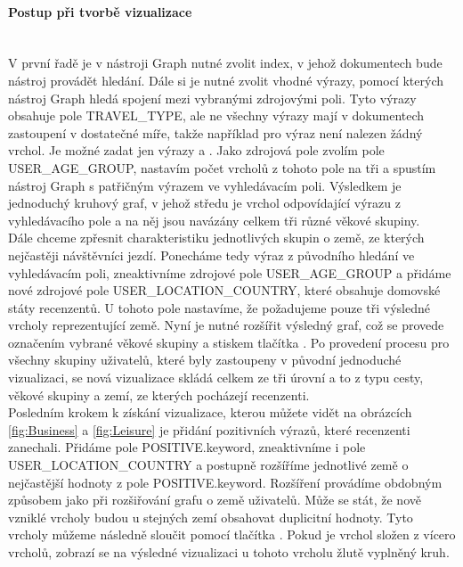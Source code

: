 \documentclass[czech,BP]{thesiskiv}
\begin{document}
\paragraph{Postup při tvorbě vizualizace}
\mbox{}\\
V první řadě je v nástroji Graph nutné zvolit index, v jehož dokumentech bude nástroj provádět hledání. Dále si je nutné zvolit vhodné výrazy, pomocí kterých nástroj Graph hledá spojení mezi vybranými zdrojovými poli. Tyto výrazy obsahuje pole TRAVEL\_TYPE, ale ne všechny výrazy mají v dokumentech zastoupení v dostatečné míře, takže například pro výraz  není nalezen žádný vrchol. Je možné zadat jen výrazy  a . Jako zdrojová pole zvolím pole USER\_AGE\_GROUP, nastavím počet vrcholů z tohoto pole na tři a spustím nástroj Graph s patřičným výrazem ve vyhledávacím poli. Výsledkem je jednoduchý kruhový graf, v jehož středu je vrchol odpovídající výrazu z vyhledávacího pole a na něj jsou navázány celkem tři různé věkové skupiny.
\\
Dále chceme zpřesnit charakteristiku jednotlivých skupin o země, ze kterých nejčastěji návštěvníci jezdí. Ponecháme tedy výraz z původního hledání ve vyhledávacím poli, zneaktivníme zdrojové pole USER\_AGE\_GROUP a přidáme nové zdrojové pole USER\_LOCATION\_COUNTRY, které obsahuje domovské státy recenzentů. U tohoto pole nastavíme, že požadujeme pouze tři výsledné vrcholy reprezentující země. Nyní je nutné rozšířit výsledný graf, což se provede označením vybrané věkové skupiny a stiskem tlačítka . Po provedení procesu  pro všechny skupiny uživatelů, které byly zastoupeny v původní jednoduché vizualizaci, se nová vizualizace skládá celkem ze tři úrovní a to z typu cesty, věkové skupiny a zemí, ze kterých pocházejí recenzenti.
\\
Posledním krokem k získání vizualizace, kterou můžete vidět na obrázcích \ref{fig:Business} a \ref{fig:Leisure} je přidání pozitivních výrazů, které recenzenti zanechali. Přidáme pole POSITIVE.keyword, zneaktivníme i pole USER\_LOCATION\_COUNTRY a postupně rozšíříme jednotlivé země o nejčastější hodnoty z pole POSITIVE.keyword. Rozšíření provádíme obdobným způsobem jako při rozšiřování grafu o země uživatelů. Může se stát, že nově vzniklé vrcholy budou u stejných zemí obsahovat duplicitní hodnoty. Tyto vrcholy můžeme následně sloučit pomocí tlačítka . Pokud je vrchol složen z vícero vrcholů, zobrazí se na výsledné vizualizaci u tohoto vrcholu žlutě vyplněný kruh.
\end{document}
